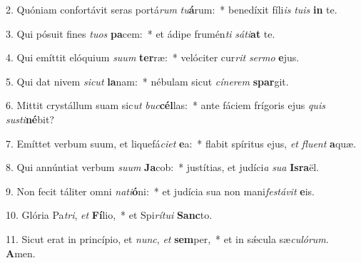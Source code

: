 2. Quóniam confortávit seras portá\textit{rum} \textit{tu}\textbf{á}rum:~*  benedíxit fíli\textit{is} \textit{tu}\textit{is} \textbf{in} te.\

3. Qui pósuit fines \textit{tu}\textit{os} \textbf{pa}cem:~*  et ádipe frumén\textit{ti} \textit{sá}\textit{ti}\textbf{at} te.\

4. Qui emíttit elóquium \textit{su}\textit{um} \textbf{ter}ræ:~*  velóciter cur\textit{rit} \textit{ser}\textit{mo} \textbf{e}jus.\

5. Qui dat nivem \textit{sic}\textit{ut} \textbf{la}nam:~*  nébulam sicut \textit{cí}\textit{ne}\textit{rem} \textbf{spar}git.\

6. Mittit crystállum suam sic\textit{ut} \textit{buc}\textbf{cél}las:~*  ante fáciem frígoris ejus \textit{quis} \textit{sus}\textit{ti}\textbf{né}bit?\

7. Emíttet verbum suum, et liquefá\textit{ci}\textit{et} \textbf{e}a:~*  flabit spíritus ejus, \textit{et} \textit{flu}\textit{ent} \textbf{a}quæ.\

8. Qui annúntiat verbum \textit{su}\textit{um} \textbf{Ja}cob:~*  justítias, et judíci\textit{a} \textit{su}\textit{a} \textbf{Is}\textbf{ra}ël.\

9. Non fecit táliter omni \textit{na}\textit{ti}\textbf{ó}ni:~*  et judícia sua non mani\textit{fes}\textit{tá}\textit{vit} \textbf{e}is.\

10. Glória Pa\textit{tri}, \textit{et} \textbf{Fí}lio,~*  et Spi\textit{rí}\textit{tu}\textit{i} \textbf{Sanc}to.\

11. Sicut erat in princípio, et \textit{nunc}, \textit{et} \textbf{sem}per,~*  et in sǽcula sæ\textit{cu}\textit{ló}\textit{rum}. \textbf{A}men.\

